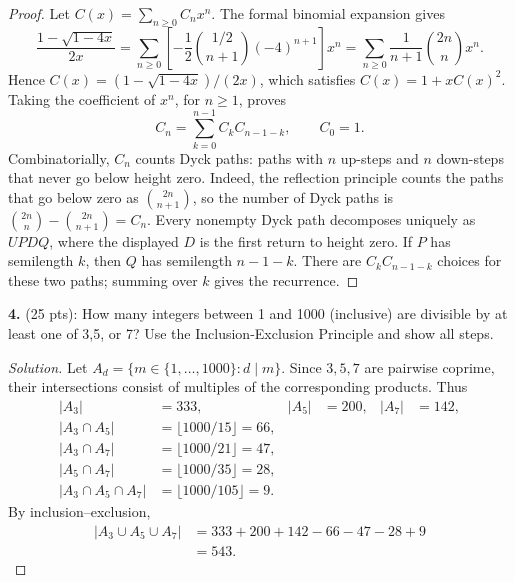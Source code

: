 \documentclass[12pt]{amsart}
\newenvironment{solution}
{\begin{proof}[Solution]}
{\end{proof}}
\begin{document}
\begin{onehalfspace}
        \begin{proof}
            Let $C(x)=\sum_{n\ge0}C_nx^n$.  The formal binomial expansion gives
            \[
                \frac{1-\sqrt{1-4x}}{2x}
                =\sum_{n\ge0}\left[-\frac12
                                 \binom{1/2}{n+1}(-4)^{n+1}\right]x^n
                =\sum_{n\ge0}\frac{1}{n+1}\binom{2n}{n}x^n.
            \]
            Hence $C(x)=(1-\sqrt{1-4x})/(2x)$, which satisfies
            $C(x)=1+xC(x)^2$.  Taking the coefficient of $x^n$, for $n\ge1$,
            proves
            \[
                C_n=\sum_{k=0}^{n-1}C_kC_{n-1-k},\qquad C_0=1.
            \]
            Combinatorially, $C_n$ counts Dyck paths: paths with $n$ up-steps
            and $n$ down-steps that never go below height zero.  Indeed, the
            reflection principle counts the paths that go below zero as
            $\binom{2n}{n+1}$, so the number of Dyck paths is
            $\binom{2n}{n}-\binom{2n}{n+1}=C_n$.
            Every nonempty Dyck path decomposes uniquely as $U P D Q$, where
            the displayed $D$ is the first return to height zero.  If $P$ has
            semilength $k$, then $Q$ has semilength $n-1-k$.  There are
            $C_kC_{n-1-k}$ choices for these two paths; summing over $k$
            gives the recurrence.
        \end{proof}

        \noindent\textbf{4.} (25 pts): How many integers between 1 and 1000 (inclusive) are
        divisible by at least one of 3,5, or 7?
        Use the Inclusion-Exclusion Principle and show all steps.

        \begin{solution}
            Let $A_d=\{m\in\{1,\ldots,1000\}:d\mid m\}$.
            Since $3,5,7$ are pairwise coprime, their intersections consist
            of multiples of the corresponding products.  Thus
            \begin{align*}
                |A_3|&=333,& |A_5|&=200,& |A_7|&=142,\\
                |A_3\cap A_5|&=\lfloor1000/15\rfloor=66,\\
                |A_3\cap A_7|&=\lfloor1000/21\rfloor=47,\\
                |A_5\cap A_7|&=\lfloor1000/35\rfloor=28,\\
                |A_3\cap A_5\cap A_7|&=\lfloor1000/105\rfloor=9.
            \end{align*}
            By inclusion--exclusion,
            \begin{align*}
                |A_3\cup A_5\cup A_7|
                &=333+200+142-66-47-28+9\\
                &=\boxed{543}.
            \end{align*}
        \end{solution}


\end{onehalfspace}
\end{document}
